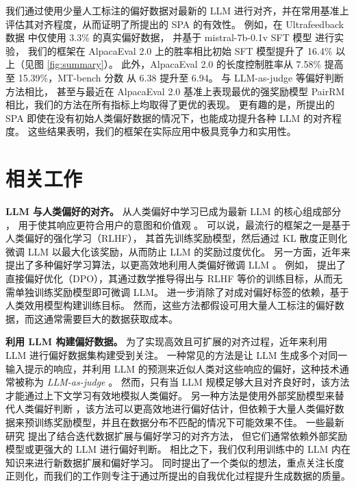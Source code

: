 我们通过使用少量人工标注的偏好数据对最新的 LLM 进行对齐，并在常用基准上评估其对齐程度，从而证明了所提出的 SPA 的有效性。  
例如，在 Ultrafeedback 数据 \citep{cui2023ultrafeedback} 中仅使用 3.3\% 的真实偏好数据，
并基于 mistral-7b-0.1v SFT 模型 \citep{jiang2023mistral} 进行实验，
我们的框架在 AlpacaEval 2.0 \citep{alpaca_eval} 上的胜率相比初始 SFT 模型提升了 16.4\% 以上（见图 \ref{fig:summary}）。  
此外，AlpacaEval 2.0 的长度控制胜率从 7.58\% 提高至 15.39\%，MT-bench 分数 \citep{zheng2023judging} 从 6.38 提升至 6.94。  
与 LLM-as-judge \citep{zheng2023judging} 等偏好判断方法相比，
甚至与最近在 AlpacaEval 2.0 基准上表现最优的强奖励模型 PairRM \citep{jiang2023llm} 相比，我们的方法在所有指标上均取得了更优的表现。  
更有趣的是，所提出的 SPA 即使在没有初始人类偏好数据的情况下，也能成功提升各种 LLM 的对齐程度。  
这些结果表明，我们的框架在实际应用中极具竞争力和实用性。  

\section{相关工作}
\textbf{LLM 与人类偏好的对齐。}
从人类偏好中学习已成为最新 LLM 的核心组成部分 \citep{claude3, openai2023gpt4, team2023gemini, touvron2023llama}，
用于使其响应更符合用户的意图和价值观 \citep{ouyang2022training, ziegler2019fine}。  
可以说，最流行的框架之一是基于人类偏好的强化学习（RLHF）\citep{christiano2017deep, lee2021pebble}，
其首先训练奖励模型，然后通过 KL 散度正则化微调 LLM 以最大化该奖励，从而防止 LLM 的奖励过度优化。  
另一方面，近年来提出了多种偏好学习算法，以更高效地利用人类偏好微调 LLM 
\citep{ethayarajh2024kto, hong2024orpo, liu2023statistical, rafailov2023direct, xu2023some, zhao2023slic, meng2024simpo}。 
例如，\citet{rafailov2023direct} 提出了直接偏好优化（DPO），其通过数学推导得出与 RLHF 等价的训练目标，从而无需单独训练奖励模型即可微调 LLM。 
\citet{ethayarajh2024kto} 进一步消除了对成对偏好标签的依赖，基于人类效用模型构建训练目标。 
然而，这些方法都假设可用大量人工标注的偏好数据，而这通常需要巨大的数据获取成本。 

\textbf{利用 LLM 构建偏好数据。}  
为了实现高效且可扩展的对齐过程，近年来利用 LLM 进行偏好数据集构建受到关注。  
一种常见的方法是让 LLM 生成多个对同一输入提示的响应，并利用 LLM 的预测来近似人类对这些响应的偏好，这种技术通常被称为 \textit{LLM-as-judge} \citep{bai2022training, yuan2024self}。  
然而，只有当 LLM 规模足够大且对齐良好时，该方法才能通过上下文学习有效地模拟人类偏好。  
另一种方法是使用外部奖励模型来替代人类偏好判断 \citep{jiang2023llm, snorkel2024pairrm}，该方法可以更高效地进行偏好估计，但依赖于大量人类偏好数据来预训练奖励模型，并且在数据分布不匹配的情况下可能效果不佳。  
一些最新研究 \citep{rosset2024direct, snorkel2024pairrm, wu2024self, xiong2024iterative} 提出了结合迭代数据扩展与偏好学习的对齐方法，  
但它们通常依赖外部奖励模型或更强大的 LLM 进行偏好判断。  
相比之下，我们仅利用训练中的 LLM 内在知识来进行新数据扩展和偏好学习。  
\cite{chen2025bootstrapping} 同时提出了一个类似的想法，重点关注长度正则化，而我们的工作则专注于通过所提出的自我优化过程提升生成数据的质量。  

